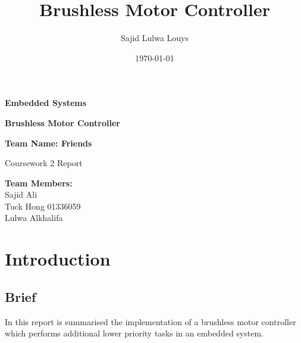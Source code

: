 \documentclass{article}
\title{Brushless Motor Controller}
\author{Sajid Lulwa Louys}
\date{\today}
\begin{document}
\begin{titlepage}
    \begin{center}
        \vspace*{1cm}
            
        \Huge
        \textbf{Embedded Systems}
            
        \vspace{0.5cm}
        \LARGE
        \textbf{Brushless Motor Controller}
            
        \vspace{1.5cm}
            
        \textbf{Team Name: Friends}\\ 
            
        \vfill
            
        Coursework 2 Report\\
       
            
        \vspace{0.8cm}
         
            
        \Large
        \textbf{Team Members:}\\
        Sajid Ali\\
        Tuck Hong 01336059\\
        Lulwa Alkhalifa \\
            
    \end{center}
\end{titlepage}


\tableofcontents
\thispagestyle{empty} %
\clearpage

\setcounter{page}{1}

\section{Introduction}
\subsection{Brief}
In this report is summarised the implementation of a brushless motor controller which performs additional lower priority tasks in an embedded system.
\end{document}
